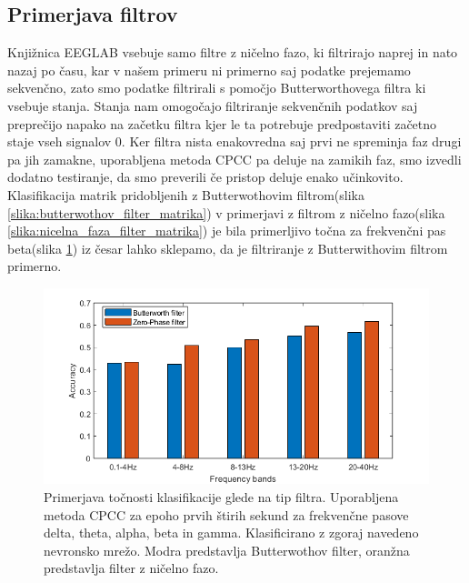 \subsection{Primerjava filtrov}
Knjižnica EEGLAB vsebuje samo filtre z ničelno fazo, ki filtrirajo naprej in nato nazaj po času, kar v našem primeru ni primerno saj podatke prejemamo sekvenčno, zato smo podatke filtrirali s pomočjo Butterworthovega filtra ki vsebuje stanja. Stanja nam omogočajo filtriranje sekvenčnih podatkov saj preprečijo napako na začetku filtra kjer le ta potrebuje predpostaviti začetno staje vseh signalov 0. Ker filtra nista enakovredna saj prvi ne spreminja faz drugi pa jih zamakne, uporabljena metoda CPCC pa deluje na zamikih faz, smo izvedli dodatno testiranje, da smo preverili če pristop deluje enako učinkovito. Klasifikacija matrik pridobljenih z Butterwothovim filtrom(slika \ref{slika:butterwothov_filter_matrika}) v primerjavi z filtrom z ničelno fazo(slika \ref{slika:nicelna_faza_filter_matrika}) je bila primerljivo točna za frekvenčni pas beta(slika \ref{slika:primerjava_filtrov}) iz česar lahko sklepamo, da je filtriranje z Butterwithovim filtrom primerno.
\begin{figure}
    \begin{center}
    \includegraphics[width=1 \linewidth]{slike/ComparisonFilters.png}
    \end{center}
    \caption{Primerjava točnosti klasifikacije glede na tip filtra. Uporabljena metoda CPCC za epoho prvih štirih sekund za frekvenčne pasove delta, theta, alpha, beta in gamma. Klasificirano z zgoraj navedeno nevronsko mrežo. Modra predstavlja Butterwothov filter, oranžna predstavlja filter z ničelno fazo.}
    \label{slika:primerjava_filtrov}
\end{figure}

